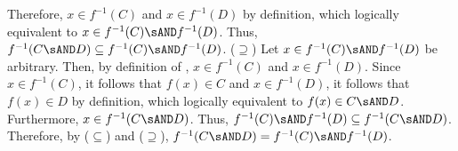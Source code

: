 \begin{enumerate}
\begin{enumerate}
\begin{subprove}
      Therefore, $x \in f^{-1}(C)$ and $x \in f^{-1}(D)$ by definition,
      which logically equivalent to $x \in f^{-1}(C) \sAND f^{-1}(D)$.
      Thus, $f^{-1}(C \sAND D) \subseteq f^{-1}(C) \sAND f^{-1}(D)$.\proofstep
      ($\supseteq$) Let $x \in f^{-1}(C) \sAND f^{-1}(D)$ be arbitrary. Then, by definition of , 
      $x \in f^{-1}(C)$ and $x \in f^{-1}(D)$.
      Since $x \in f^{-1}(C)$, it follows that $f(x) \in C$
      and $x \in f^{-1}(D)$, it follows that $f(x) \in D$ by definition,
      which logically equivalent to $f(x) \in C \sAND D$.
      Furthermore, $x \in f^{-1}(C \sAND D)$.
      Thus, $f^{-1}(C) \sAND f^{-1}(D) \subseteq f^{-1}(C \sAND D)$.\proofstep
      Therefore, by ($\subseteq$) and ($\supseteq$), $f^{-1}(C \sAND D)=f^{-1}(C) \sAND f^{-1}(D)$.
    \end{subprove}
  \end{enumerate}








\end{enumerate}
